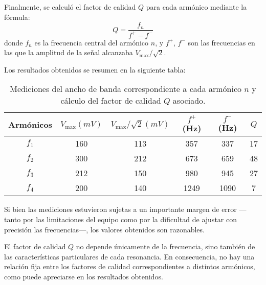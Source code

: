 \documentclass[12pt, a4paper]{article}
\newcounter{step}
\newcounter{normalstep}
\newcommand{\normalstep}[1]
{
  \par\vspace{1ex}
  \stepcounter{normalstep}
  \noindent{\arabic{normalstep}.} #1\par\vspace{1ex}
}
\begin{document}
\normalstep{Finalmente, se calculó el factor de calidad $Q$ para cada armónico mediante la fórmula:
$$Q = \frac{f_n}{f^+ - f^-}$$
donde $f_n$ es la frecuencia central del armónico $n$, y $f^+$, $f^-$ son las frecuencias en las que la amplitud de la señal alcanzaba $V_\mathrm{max}/\sqrt{2}$.}

Los resultados obtenidos se resumen en la siguiente tabla:

\begin{table}[H]
    \centering
    \begin{tabular}{|c|c|c|c|c|c|}
    \hline
    \multirow{1}{2.1cm}{\centering Armónicos} 
        & $V_\mathrm{max} (mV)$
        & $V_\mathrm{max}/\sqrt{2} (mV)$ 
        & $f^+$ (Hz) 
        & $f^-$ (Hz)
        & $Q$ \\
    \hline
    $f_1$  & 160 & 113 & 357 & 337 & 17\\ \hline
    $f_2$  & 300 & 212 & 673 & 659 & 48\\ \hline
    $f_3$  & 212  & 150 & 980 & 945 & 27\\ \hline
    $f_4$  & 200  & 140 & 1249 & 1090 & 7\\ \hline
    \end{tabular}
    \caption{Mediciones del ancho de banda correspondiente a cada armónico $n$ y cálculo del factor de calidad $Q$ asociado.}
    \label{tabla3}
\end{table}

Si bien las mediciones estuvieron sujetas a un importante margen de error —tanto por las limitaciones del equipo como por la dificultad de ajustar con precisión las frecuencias—, los valores obtenidos son razonables. 

El factor de calidad $Q$ no depende únicamente de la frecuencia, sino también de las características particulares de cada resonancia. En consecuencia, no hay una relación fija entre los factores de calidad correspondientes a distintos armónicos, como puede apreciarse en los resultados obtenidos.
\end{document}
